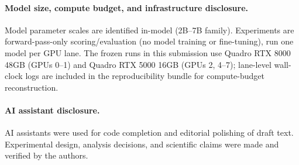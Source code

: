 \paragraph{Model size, compute budget, and infrastructure disclosure.}
Model parameter scales are identified in-model (2B--7B family). Experiments are forward-pass-only scoring/evaluation (no model training or fine-tuning), run one model per GPU lane. The frozen runs in this submission use Quadro RTX 8000 48GB (GPUs 0--1) and Quadro RTX 5000 16GB (GPUs 2, 4--7); lane-level wall-clock logs are included in the reproducibility bundle for compute-budget reconstruction.

\paragraph{AI assistant disclosure.}
AI assistants were used for code completion and editorial polishing of draft text. Experimental design, analysis decisions, and scientific claims were made and verified by the authors.

\begin{table}[H]
\centering
\footnotesize
{}
\caption{Corrected retention semantics from the frozen artifact bundle: pre-sampling alignability (raw pairs satisfying the single-token criterion before subsampling) versus post-sampling analysis inclusion (frozen slice used in downstream tests).}
\label{tab:alignment-retention-main}
\end{table}

